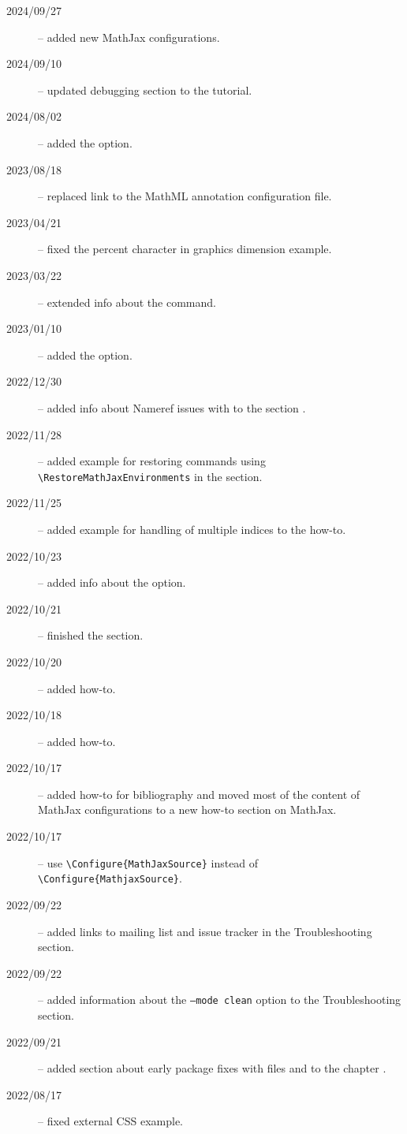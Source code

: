 
\begin{description}
  \item[2024/09/27] -- added new MathJax configurations. 
  \item[2024/09/10] -- updated debugging section to the tutorial.
  \item[2024/08/02] -- added the  option.
  \item[2023/08/18] -- replaced link to the MathML annotation configuration file.
  \item[2023/04/21] -- fixed the percent character in graphics dimension example.
  \item[2023/03/22] -- extended info about the  command.
  \item[2023/01/10] -- added the  option.
  \item[2022/12/30] -- added info about Nameref issues with  to the section .
  \item[2022/11/28] -- added example for restoring commands using \verb|\RestoreMathJaxEnvironments| in the  section.
  \item[2022/11/25] -- added example for handling of multiple indices to the  how-to.
  \item[2022/10/23] -- added info about the  option.
  \item[2022/10/21] -- finished the  section.
  \item[2022/10/20] -- added  how-to.
  \item[2022/10/18] -- added  how-to.
  \item[2022/10/17] -- added how-to for bibliography and moved most of the content of MathJax configurations to a new how-to section on MathJax. 
  \item[2022/10/17] -- use \verb|\Configure{MathJaxSource}| instead of \verb|\Configure{MathjaxSource}|.
  \item[2022/09/22] -- added links to mailing list and issue tracker in the Troubleshooting section.
  \item[2022/09/22] -- added information about the \texttt{--mode clean} option to the Troubleshooting section.
  \item[2022/09/21] -- added section about early package fixes with  files and  to the chapter .
  \item[2022/08/17] -- fixed external CSS example.

\end{description}
